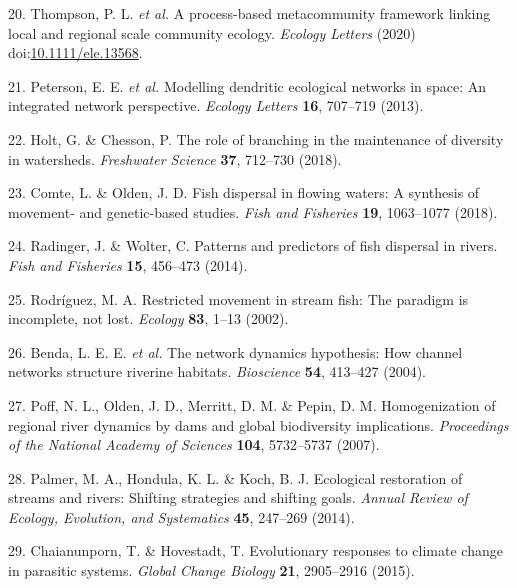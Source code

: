 \documentclass[
]{article}
\newenvironment{cslreferences}%
  {}%
  {\par}
\begin{document}
\begin{cslreferences}
\leavevmode\hypertarget{ref-thompsonProcessbasedMetacommunityFramework2020}{}%
20. Thompson, P. L. \emph{et al.} A process-based metacommunity
framework linking local and regional scale community ecology.
\emph{Ecology Letters} (2020)
doi:\href{https://doi.org/10.1111/ele.13568}{10.1111/ele.13568}.

\leavevmode\hypertarget{ref-petersonModellingDendriticEcological2013}{}%
21. Peterson, E. E. \emph{et al.} Modelling dendritic ecological
networks in space: An integrated network perspective. \emph{Ecology
Letters} \textbf{16}, 707--719 (2013).

\leavevmode\hypertarget{ref-holtRoleBranchingMaintenance2018}{}%
22. Holt, G. \& Chesson, P. The role of branching in the maintenance of
diversity in watersheds. \emph{Freshwater Science} \textbf{37}, 712--730
(2018).

\leavevmode\hypertarget{ref-comteFishDispersalFlowing2018}{}%
23. Comte, L. \& Olden, J. D. Fish dispersal in flowing waters: A
synthesis of movement- and genetic-based studies. \emph{Fish and
Fisheries} \textbf{19}, 1063--1077 (2018).

\leavevmode\hypertarget{ref-radingerPatternsPredictorsFish2014}{}%
24. Radinger, J. \& Wolter, C. Patterns and predictors of fish dispersal
in rivers. \emph{Fish and Fisheries} \textbf{15}, 456--473 (2014).

\leavevmode\hypertarget{ref-rodriguezRestrictedMovementStream2002}{}%
25. Rodríguez, M. A. Restricted movement in stream fish: The paradigm is
incomplete, not lost. \emph{Ecology} \textbf{83}, 1--13 (2002).

\leavevmode\hypertarget{ref-bendaNetworkDynamicsHypothesis2004}{}%
26. Benda, L. E. E. \emph{et al.} The network dynamics hypothesis: How
channel networks structure riverine habitats. \emph{Bioscience}
\textbf{54}, 413--427 (2004).

\leavevmode\hypertarget{ref-poffHomogenizationRegionalRiver2007}{}%
27. Poff, N. L., Olden, J. D., Merritt, D. M. \& Pepin, D. M.
Homogenization of regional river dynamics by dams and global
biodiversity implications. \emph{Proceedings of the National Academy of
Sciences} \textbf{104}, 5732--5737 (2007).

\leavevmode\hypertarget{ref-palmerEcologicalRestorationStreams2014}{}%
28. Palmer, M. A., Hondula, K. L. \& Koch, B. J. Ecological restoration
of streams and rivers: Shifting strategies and shifting goals.
\emph{Annual Review of Ecology, Evolution, and Systematics} \textbf{45},
247--269 (2014).

\leavevmode\hypertarget{ref-chaianunpornEvolutionaryResponsesClimate2015}{}%
29. Chaianunporn, T. \& Hovestadt, T. Evolutionary responses to climate
change in parasitic systems. \emph{Global Change Biology} \textbf{21},
2905--2916 (2015).
\end{cslreferences}
\end{document}

